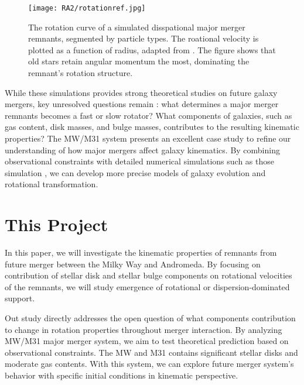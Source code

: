 \documentclass[twocolumn, trackchanges]{aastex7}
\begin{document}
\begin{figure}
  \centering
  \texttt{[image: RA2/rotationref.jpg]}
  \caption{The rotation curve of a simulated disspational major merger remnants, segmented by particle types. The roational velocity is plotted as a function of radius, adapted from \cite{Cox_2006}. The figure shows that old stars retain angular momentum the most, dominating the remnant's rotation structure. }
  \label{fig:rotationref}
\end{figure}



While these simulations provides strong theoretical studies on future galaxy mergers, key unresolved questions remain : what determines a major merger remnants becomes a fast or slow rotator? What components of galaxies, such as gas content, disk masses, and bulge masses, contributes to the resulting kinematic properties? The MW/M31 system presents an excellent case study to refine our understanding of how major mergers affect galaxy kinematics. By combining observational constraints with detailed numerical simulations such as those simulation \citep{van_der_Marel_2012}, we can develop more precise models of galaxy evolution and rotational transformation.

\section{This Project} 

In this paper, we will investigate the kinematic properties of remnants from future merger between the Milky Way and Andromeda. By focusing on contribution of stellar disk and stellar bulge components on rotational velocities of the remnants, we will study emergence of rotational or dispersion-dominated support. 

Out study directly addresses the open question of what components contribution to change in rotation properties throughout merger interaction. By analyzing MW/M31 major merger system, we aim to test theoretical prediction based on observational constraints. The MW and M31 contains significant stellar disks and moderate gas contents. With this system, we can explore future merger system's behavior with specific initial conditions in kinematic perspective. 
\end{document}
